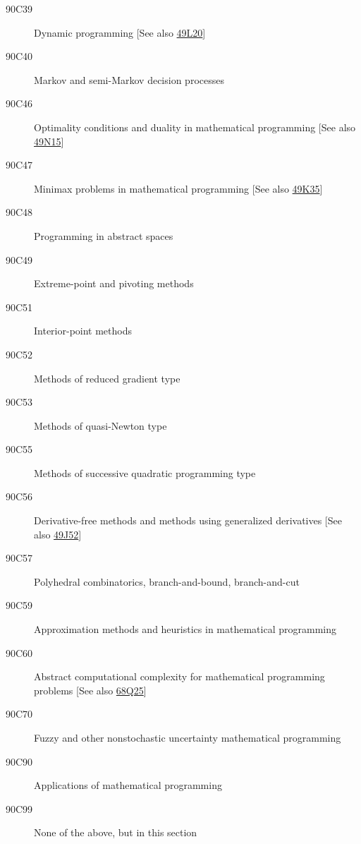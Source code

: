 \documentclass[letterpaper]{article}
\begin{document}
\begin{description}
\item [90C39]\label{90C39} Dynamic programming [See also \hyperref[49L20]{49L20}]
\item [90C40]\label{90C40} Markov and semi-Markov decision processes
\item [90C46]\label{90C46} Optimality conditions and duality in mathematical programming [See also \hyperref[49N15]{49N15}]
\item [90C47]\label{90C47} Minimax problems in mathematical programming [See also \hyperref[49K35]{49K35}]
\item [90C48]\label{90C48} Programming in abstract spaces
\item [90C49]\label{90C49} Extreme-point and pivoting methods
\item [90C51]\label{90C51} Interior-point methods
\item [90C52]\label{90C52} Methods of reduced gradient type
\item [90C53]\label{90C53} Methods of quasi-Newton type
\item [90C55]\label{90C55} Methods of successive quadratic programming type
\item [90C56]\label{90C56} Derivative-free methods and methods using generalized derivatives [See also \hyperref[49J52]{49J52}]
\item [90C57]\label{90C57} Polyhedral combinatorics, branch-and-bound, branch-and-cut
\item [90C59]\label{90C59} Approximation methods and heuristics in mathematical programming
\item [90C60]\label{90C60} Abstract computational complexity for mathematical programming problems [See also \hyperref[68Q25]{68Q25}]
\item [90C70]\label{90C70} Fuzzy and other nonstochastic uncertainty mathematical programming 
\item [90C90]\label{90C90} Applications of mathematical programming
\item [90C99]\label{90C99} None of the above, but in this section
\end{description}
\end{document}
